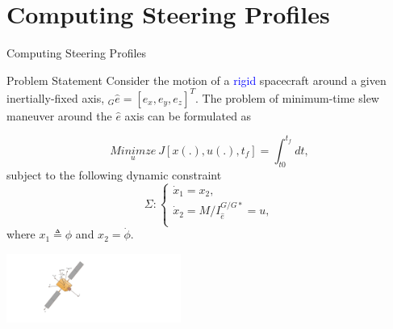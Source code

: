 \documentclass{beamer}
\begin{document}
\section{Computing Steering Profiles}
\begin{frame}{Computing Steering Profiles}
\begin{block}{ Problem Statement}
Consider the motion of a \textcolor{blue}{rigid} spacecraft around a given inertially-fixed axis, $_G\hat{e}=[e_x,e_y,e_z]^T$. The problem of minimum-time slew maneuver around the $\hat{e}$ axis can be formulated as

\begin{minipage}{0.55\textwidth}
\begin{equation}\label{costfunction}
\underset{u}{Minimze}\ J[x(.), u(.), t_f]=\int_{t0}^{t_f} dt,
\end{equation}
subject to the following dynamic constraint
\begin{equation}\label{system}
 \Sigma:\left\{
                \begin{array}{l}
                \dot{x}_1=x_2, \\
                \dot{x}_2=M/I_{\hat{e}}^{G/G*}=u, \\
                \end{array}
              \right.
 \end{equation}
where $x_1\triangleq\phi$ and $x_2=\dot{\phi}$. 
\end{minipage}
\begin{minipage}{0.35\textwidth}
\begin{center}
\includegraphics[width=2.25in]{./Figures/Spacecraft}      
\end{center}
\end{minipage}
\end{block}
\end{frame}
\end{document}
